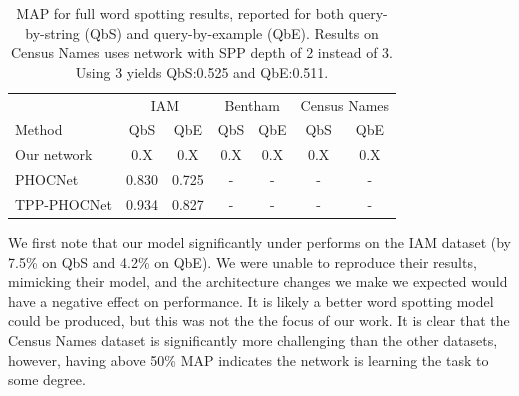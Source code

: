 \documentclass[ms,electronic,twosidetoc,letterpaper,chaptercenter,parttop,lol,lof,lot]{byumsphd}
\begin{document}
\begin{table}
\centering
\begin{tabular}{| l | c  c | c c | c c |}
  \hline
   & \multicolumn{2}{c|}{IAM} & \multicolumn{2}{c|}{Bentham} & \multicolumn{2}{c|}{Census Names}\\
  Method & QbS & QbE & QbS & QbE & QbS & QbE\\
  \hline		
  Our network  &  0.X & 0.X  &  0.X & 0.X  &  0.X & 0.X  %
  \\
  PHOCNet\cite{sudholt2016} & 0.830 & 0.725 & - & - & - & - \\
  TPP-PHOCNet\cite{sudholt2017} & 0.934 & 0.827 & - & - & - & - \\
  \hline  
\end{tabular}
\caption{MAP for full word spotting results, reported for both query-by-string (QbS) and query-by-example (QbE). Results on Census Names uses network with SPP depth of 2 instead of 3. Using 3 yields QbS:0.525 and QbE:0.511.}
\label{tab:wordspottingresults}
\end{table}



We first note that our model significantly under performs \cite{sudholt2016} on the IAM dataset (by 7.5\% on QbS and 4.2\% on QbE). We were unable to reproduce their results, mimicking their model, and the architecture changes we make we expected would have a negative effect on performance. It is likely a better word spotting model could be produced, but this was not the the focus of our work.
It is clear that the Census Names dataset is significantly more challenging than the other datasets, however, having above 50\% MAP indicates the network is learning the task to some degree.
\end{document}
